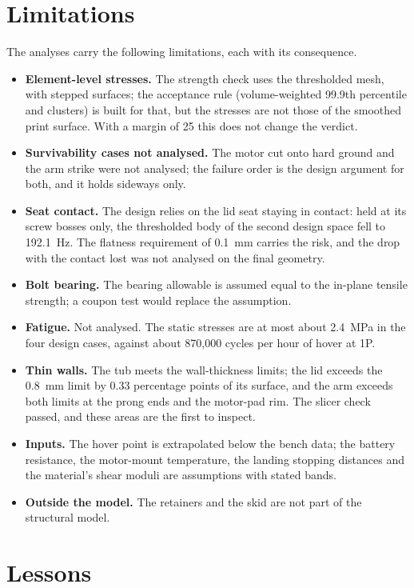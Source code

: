 \section{Limitations}\label{sec:res-limits}

The analyses carry the following limitations, each with its consequence.
\begin{itemize}
\item \textbf{Element-level stresses.} The strength check uses the thresholded mesh, with stepped surfaces; the acceptance rule (volume-weighted 99.9th percentile and clusters) is built for that, but the stresses are not those of the smoothed print surface. With a margin of 25 this does not change the verdict.
\item \textbf{Survivability cases not analysed.} The motor cut onto hard ground and the arm strike were not analysed; the failure order is the design argument for both, and it holds sideways only.
\item \textbf{Seat contact.} The design relies on the lid seat staying in contact: held at its screw bosses only, the thresholded body of the second design space fell to \SI{192.1}{Hz}. The flatness requirement of \SI{0.1}{mm} carries the risk, and the drop with the contact lost was not analysed on the final geometry.
\item \textbf{Bolt bearing.} The bearing allowable is assumed equal to the in-plane tensile strength; a coupon test would replace the assumption.
\item \textbf{Fatigue.} Not analysed. The static stresses are at most about \SI{2.4}{MPa} in the four design cases, against about 870,000 cycles per hour of hover at 1P.
\item \textbf{Thin walls.} The tub meets the wall-thickness limits; the lid exceeds the \SI{0.8}{mm} limit by 0.33 percentage points of its surface, and the arm exceeds both limits at the prong ends and the motor-pad rim. The slicer check passed, and these areas are the first to inspect.
\item \textbf{Inputs.} The hover point is extrapolated below the bench data; the battery resistance, the motor-mount temperature, the landing stopping distances and the material's shear moduli are assumptions with stated bands.
\item \textbf{Outside the model.} The retainers and the skid are not part of the structural model.
\end{itemize}

\section{Lessons}\label{sec:res-lessons}

